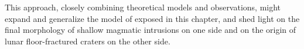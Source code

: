 This approach, closely combining  theoretical models and observations,
might  expand  and  generalize  the  model  of  \citet{Michaut:2011kg}
exposed in  this chapter, and  shed light  on the final  morphology of
shallow magmatic  intrusions on one  side and  on the origin  of lunar
floor-fractured craters on the other side.

\newpage





